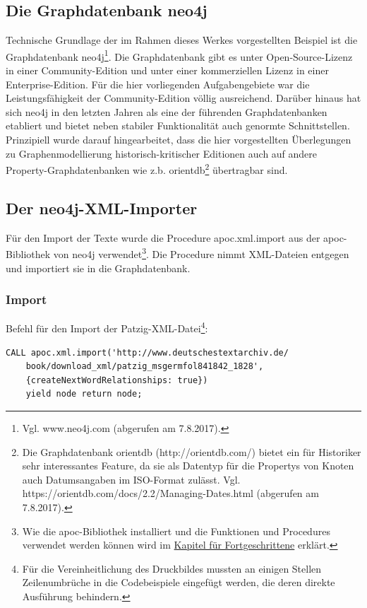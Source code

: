 \documentclass[ngerman,]{scrreprt}
\begin{document}
\subsection{Die Graphdatenbank neo4j}\label{die-graphdatenbank-neo4j}

Technische Grundlage der im Rahmen dieses Werkes vorgestellten Beispiel ist die Graphdatenbank neo4j\footnote{Vgl. www.neo4j.com (abgerufen am 7.8.2017).}. Die Graphdatenbank gibt es unter Open-Source-Lizenz in einer Community-Edition und unter einer kommerziellen Lizenz in einer Enterprise-Edition. Für die hier vorliegenden Aufgabengebiete war die Leistungsfähigkeit der Community-Edition völlig ausreichend. Darüber hinaus hat sich neo4j in den letzten Jahren als eine der führenden Graphdatenbanken etabliert und bietet neben stabiler Funktionalität auch genormte Schnittstellen. Prinzipiell wurde darauf hingearbeitet, dass die hier vorgestellten Überlegungen zu Graphenmodellierung historisch-kritischer Editionen auch auf andere Property-Graphdatenbanken wie z.b. orientdb\footnote{Die Graphdatenbank orientdb (http://orientdb.com/) bietet ein für Historiker sehr interessantes Feature, da sie als Datentyp für die Propertys von Knoten auch Datumsangaben im ISO-Format zulässt. Vgl. https://orientdb.com/docs/2.2/Managing-Dates.html (abgerufen am 7.8.2017).} übertragbar sind.

\subsection{Der neo4j-XML-Importer}\label{der-neo4j-xml-importer}

Für den Import der Texte wurde die Procedure apoc.xml.import aus der apoc-Bibliothek von neo4j verwendet\footnote{Wie die apoc-Bibliothek installiert und die Funktionen und Procedures verwendet werden können wird im \href{85-cypher-fuer-Fortgeschrittene.md}{Kapitel für Fortgeschrittene} erklärt.}. Die Procedure nimmt XML-Dateien entgegen und importiert sie in die Graphdatenbank.

\subsubsection{Import}\label{import}

Befehl für den Import der Patzig-XML-Datei\footnote{Für die Vereinheitlichung des Druckbildes mussten an einigen Stellen Zeilenumbrüche in die Codebeispiele eingefügt werden, die deren direkte Ausführung behindern.}:

\begin{verbatim}
CALL apoc.xml.import('http://www.deutschestextarchiv.de/
    book/download_xml/patzig_msgermfol841842_1828',
    {createNextWordRelationships: true})    
    yield node return node;
\end{verbatim}
\end{document}
